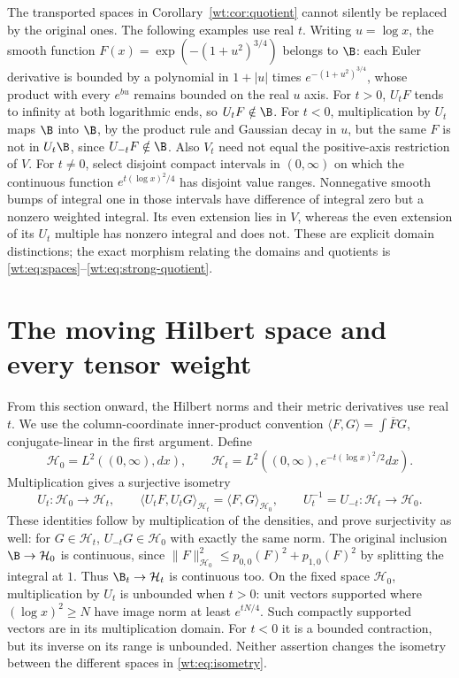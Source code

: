 The transported spaces in Corollary~\ref{wt:cor:quotient} cannot silently be
replaced by the original ones.  The following examples use real
$t$.  Writing $u=\log x$,
the smooth function
$F(x)=\exp(-(1+u^2)^{3/4})$ belongs to $\B$: each Euler
derivative is bounded by a polynomial in $1+|u|$ times
$e^{-(1+u^2)^{3/4}}$, whose product with every $e^{b u}$
remains bounded on the real $u$ axis.
For $t>0$, $U_tF$ tends to infinity at both logarithmic ends,
so $U_tF\notin\B$.  For $t<0$, multiplication by $U_t$ maps
$\B$ into $\B$, by the product rule and Gaussian decay in $u$,
but the same $F$ is not in $U_t\B$, since $U_{-t}F\notin\B$.
Also $V_t$ need not equal the positive-axis restriction of $V$.
For $t\ne0$, select disjoint compact intervals in $(0,\infty)$
on which the continuous function $e^{t(\log x)^2/4}$ has disjoint
value ranges.  Nonnegative smooth bumps of integral one in those
intervals have difference of integral zero but a nonzero weighted
integral.  Its even extension lies in $V$, whereas the even
extension of its $U_t$ multiple has nonzero integral and does not.
These are explicit domain distinctions; the exact morphism
relating the domains and quotients is
\eqref{wt:eq:spaces}--\eqref{wt:eq:strong-quotient}.

\section{The moving Hilbert space and every tensor weight}
\label{wt:sec:Hilbert}

From this section onward, the Hilbert norms and their metric
derivatives use real $t$.  We use the column-coordinate inner-product convention
$\langle F,G\rangle=\int\overline F G$, conjugate-linear in
the first argument.  Define
\begin{equation}\label{wt:eq:Hilbert}
 \mathcal H_0=L^2((0,\infty),dx),\qquad
 \mathcal H_t=L^2((0,\infty),e^{-t(\log x)^2/2}dx).
\end{equation}
Multiplication gives a surjective isometry
\begin{equation}\label{wt:eq:isometry}
 U_t:\mathcal H_0\longrightarrow \mathcal H_t,\qquad
 \langle U_tF,U_tG\rangle_{\mathcal H_t}=\langle F,G\rangle_{\mathcal H_0},
 \qquad U_t^{-1}=U_{-t}:\mathcal H_t\longrightarrow \mathcal H_0.
\end{equation}
These identities follow by multiplication of the densities,
and prove surjectivity as well: for $G\in \mathcal H_t$, $U_{-t}G\in \mathcal H_0$
with exactly the same norm.  The original inclusion $\B\to \mathcal H_0$
is continuous, since
$\|F\|_{\mathcal H_0}^2\leq p_{0,0}(F)^2+p_{1,0}(F)^2$ by splitting
the integral at $1$.  Thus $\B_t\to \mathcal H_t$ is continuous too.
On the fixed space $\mathcal H_0$, multiplication by $U_t$ is unbounded
when $t>0$: unit vectors supported where $(\log x)^2\geq N$
have image norm at least $e^{tN/4}$.  Such compactly supported
vectors are in its multiplication domain.  For $t<0$ it is a
bounded contraction, but its inverse on its range is unbounded.
Neither assertion changes the isometry between the different
spaces in \eqref{wt:eq:isometry}.

